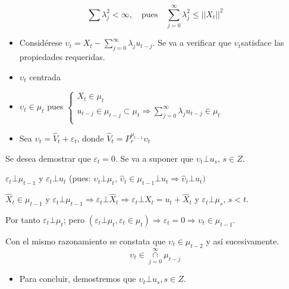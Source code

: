 \[\sum\lambda_{j}^{2} <\infty,\quad\text{pues}\quad \sum_{j=0}^{\infty} \lambda_{j}^{2} \leq \left|\left| X_{t} \right|\right|^{2}\]

\begin{itemize}
\item Consid\'{e}rese $\upsilon_{t} =X_{t} -\sum_{j=0}^{\infty}\lambda_{j} u_{t-j}$. Se va a verificar que $\upsilon_{t} $satisface las propiedades requeridas.
\item $\upsilon_{t} $ centrada
\item $\upsilon_{t} \in \mu_{t} $ pues $\left\{ {\begin{array}{l}
 X_{t} \in \mu_{t} \\ 
 u_{t-j} \in \mu_{t-j} \subset \mu_{t} \Rightarrow \sum\limits_{j=0}^\infty {\lambda_{j} u_{t-j} \in \mu_{t} } \\ 
 \end{array}} \right.$
\item Sea $\upsilon_{t} =\hat{{V}}_{t} +\varepsilon_{t}$, donde $\hat{V}_{t} =P_{r}^{\mu_{t-1} } \upsilon_{t} $
\end{itemize}

Se desea demostrar que $\varepsilon_{t} =0$. Se va a suponer que $\upsilon_{t} \bot u_{s}$, $s\in Z$.\newline

$\varepsilon_{t} \bot \mu_{t-1}$ y $\varepsilon_{t} \bot u_{t}$ (pues: $\upsilon_{t} \bot \mu_{t}$, $\hat{\upsilon}_{t} \in \mu_{t-1} \bot u_{t} \Rightarrow \hat{\upsilon}_{t} \bot u_{t} )$\newline

$\hat{X}_{t} \in \mu_{t-1}$ y $\varepsilon_{t} \bot \mu_{t-1} \Rightarrow \varepsilon_{t} \bot \hat{X}_{t} \Rightarrow \varepsilon_{t} \bot X_{t} =u_{t} +\hat{X}_{t}$ y $\varepsilon_{t} \bot \mu_{s}$, $s<t$.\newline

Por tanto $\varepsilon_{t} \bot \mu_{t}$; pero $\left(\varepsilon_{t} \bot \mu_{t}, \varepsilon_{t} \in \mu_{t} \right)\Rightarrow \varepsilon_{t} =0\Rightarrow \upsilon_{t} \in \mu_{t-1} $.\newline

Con el mismo razonamiento se constata que $\upsilon_{t} \in \mu_{t-2}$ y así sucesivamente.
\[
\upsilon_{t} \in \mathop \cap\limits_{j=0}^{\infty } \mu_{t-j} 
\]

\begin{itemize}
      \item Para concluir, demostremos que $\upsilon_{t} \bot u_{s}, s\in Z$.
\end{itemize}

